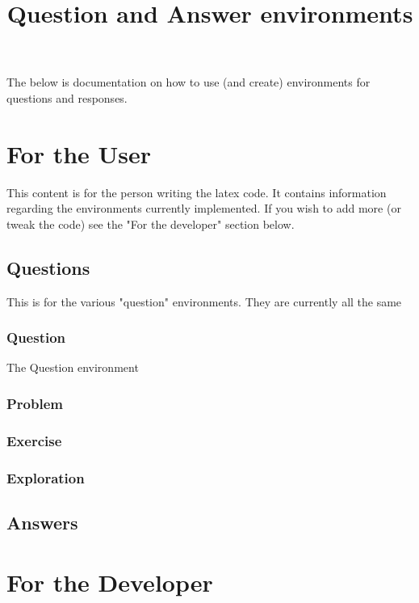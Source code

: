 \documentclass{ximera}
\title{Question and Answer environments}
\begin{document}
The below is documentation on how to use (and create) environments for questions and responses.

\maketoc

\section{For the User}
This content is for the person writing the latex code. It contains information regarding the environments currently implemented. If you wish to add more (or tweak the code) see the "For the developer" section below.

\subsection{Questions}
This is for the various "question" environments. They are currently all the same 
\subsubsection{Question}
The Question environment
\subsubsection{Problem}

\subsubsection{Exercise}

\subsubsection{Exploration}

\subsection{Answers}



\section{For the Developer}
\end{document}
